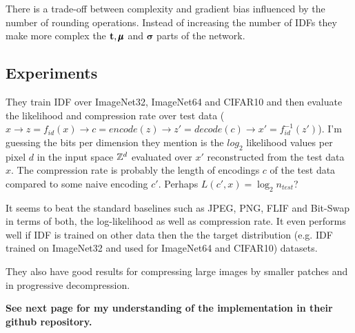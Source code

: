 There is a trade-off between complexity and gradient bias influenced by the number of rounding operations. Instead of increasing the number of IDFs they make more complex the $\mathbf{t}, \pmb{\mu}$ and $\pmb{\sigma}$ parts of the network.

\subsection{Experiments}

They train IDF over ImageNet32, ImageNet64 and CIFAR10 and then evaluate the likelihood and compression rate over test data ($x \to z = f_{id}(x) \to c = encode(z) \to z'=decode(c) \to x' = f_{id}^{-1}(z')$). I'm guessing the bits per dimension they mention is the $log_2$ likelihood values per pixel $d$ in the input space $\mathbb{Z}^d$ evaluated over $x'$ reconstructed from the test data $x$. The compression rate is probably the length of encodings $c$ of the test data compared to some naive encoding $c'$. Perhaps $L(c', x) = \log_2 n_{test}$?

It seems to beat the standard baselines such as JPEG, PNG, FLIF and Bit-Swap in terms of both, the log-likelihood as well as compression rate.
It even performs well if IDF is trained on other data then the the target distribution (e.g. IDF trained on ImageNet32 and used for ImageNet64 and CIFAR10) datasets.

They also have good results for compressing large images by smaller patches and in progressive decompression.

\textbf{See next page for my understanding of the implementation in their github repository.}


